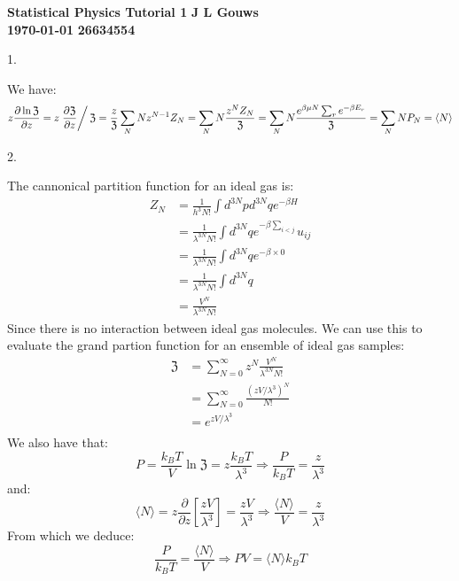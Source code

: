 \documentclass[a4paper,12pt]{article}
\newcommand\block[1]{\hspace*{#1}}
\begin{document}
\selectfont
{\Large \textbf{Statistical Physics Tutorial 1}} \hfill {\Large \textbf{J L Gouws}}\\
\block{1.0cm} {\large \textbf{\today}} \hfill {\large \textbf{26634554}}\\
\thispagestyle{empty}

1.
\begin{minipage}[t]{0.9\textwidth}
  We have:
  \begin{align*}
    z \frac{ \partial \ln \mathfrak{Z}}{\partial z} = z\left. \frac{\partial \mathfrak{Z}}{\partial z} \right/ \mathfrak{Z} = \frac{z}{\mathfrak{Z}} \sum_{N} N z^{N - 1} Z_N = \sum_{N} N \frac{z^{N} Z_N}{\mathfrak{Z}}= \sum_{N} N \frac{e^{\beta \mu N} \sum_re^{-\beta E_r}}{\mathfrak{Z}} = \sum_{N} N P_N = \langle N \rangle
  \end{align*}
\end{minipage}

2.
\begin{minipage}[t]{0.9\textwidth}
  The cannonical partition function for an ideal gas is:
  \begin{align*}
    Z_N &= \frac{1}{h^3N!} \int d^{3N}p d^{3N}qe^{-\beta H}\\
        &= \frac{1}{\lambda^{3N}N!} \int d^{3N}q e^{-\beta \sum_{i < j}} u_{ij}\\
        &= \frac{1}{\lambda^{3N}N!} \int d^{3N}q e^{-\beta \times 0}\\
        &= \frac{1}{\lambda^{3N}N!} \int d^{3N}q \\
        &= \frac{V^N}{\lambda^{3N}N!}
  \end{align*}  
  Since there is no interaction between ideal gas molecules.
  We can use this to evaluate the grand partion function for an ensemble of ideal gas samples:
  \begin{align*}
    \mathfrak{Z} &= \sum_{N = 0}^\infty z^N \frac{V^N}{\lambda^{3N}N!}\\
                 &= \sum_{N = 0}^\infty \frac{(zV/\lambda^3)^N}{N!}\\
                 &= e^{zV/\lambda^3}\\
  \end{align*}
  We also have that:
  \begin{equation*}
    P = \frac{k_BT}{V} \ln \mathfrak{Z} = z\frac{k_BT}{\lambda^3} \Rightarrow \frac{P}{k_BT} = \frac{z}{\lambda^3}
  \end{equation*}
  and:
  \begin{equation*}
    \langle N\rangle = z \frac{\partial}{\partial z} \left[ \frac{zV}{\lambda^3} \right] = \frac{zV}{\lambda^3} \Rightarrow \frac{\langle N \rangle}{V} = \frac{z}{\lambda^3}
  \end{equation*}
  From which we deduce:
  \begin{equation*}
    \frac{P}{k_BT} = \frac{\langle N \rangle}{V} \Rightarrow PV = \langle N \rangle k_BT
  \end{equation*}
\end{minipage}
\end{document}
